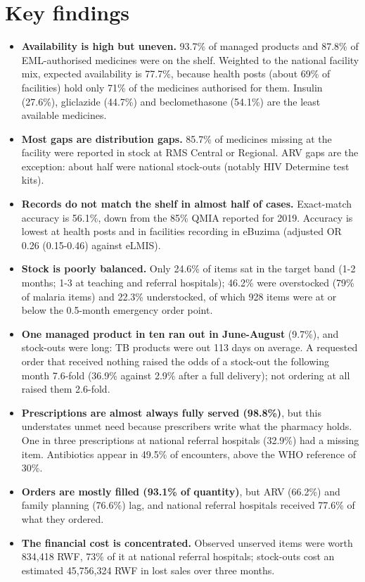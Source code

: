 \documentclass[10pt,a4paper]{report}
\begin{document}
\section*{Key findings}
\begin{itemize}\item \textbf{Availability is high but uneven.} 93.7\% of managed products and 87.8\% of EML-authorised medicines were on the shelf. Weighted to the national facility mix, expected availability is 77.7\%, because health posts (about 69\% of facilities) hold only 71\% of the medicines authorised for them. Insulin (27.6\%), gliclazide (44.7\%) and beclomethasone (54.1\%) are the least available medicines.
\item \textbf{Most gaps are distribution gaps.} 85.7\% of medicines missing at the facility were reported in stock at RMS Central or Regional. ARV gaps are the exception: about half were national stock-outs (notably HIV Determine test kits).
\item \textbf{Records do not match the shelf in almost half of cases.} Exact-match accuracy is 56.1\%, down from the 85\% QMIA reported for 2019. Accuracy is lowest at health posts and in facilities recording in eBuzima (adjusted OR 0.26 (0.15-0.46) against eLMIS).
\item \textbf{Stock is poorly balanced.} Only 24.6\% of items sat in the target band (1-2 months; 1-3 at teaching and referral hospitals); 46.2\% were overstocked (79\% of malaria items) and 22.3\% understocked, of which 928 items were at or below the 0.5-month emergency order point.
\item \textbf{One managed product in ten ran out in June-August} (9.7\%), and stock-outs were long: TB products were out 113 days on average. A requested order that received nothing raised the odds of a stock-out the following month 7.6-fold (36.9\% against 2.9\% after a full delivery); not ordering at all raised them 2.6-fold.
\item \textbf{Prescriptions are almost always fully served (98.8\%)}, but this understates unmet need because prescribers write what the pharmacy holds. One in three prescriptions at national referral hospitals (32.9\%) had a missing item. Antibiotics appear in 49.5\% of encounters, above the WHO reference of 30\%.
\item \textbf{Orders are mostly filled (93.1\% of quantity)}, but ARV (66.2\%) and family planning (76.6\%) lag, and national referral hospitals received 77.6\% of what they ordered.
\item \textbf{The financial cost is concentrated.} Observed unserved items were worth 834,418 RWF, 73\% of it at national referral hospitals; stock-outs cost an estimated 45,756,324 RWF in lost sales over three months.

\end{itemize}
\end{document}
